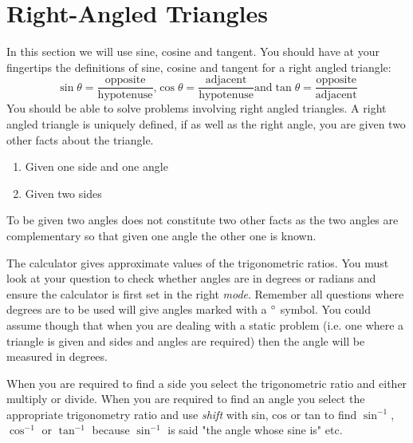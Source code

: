 \section{Right-Angled Triangles}
In this section we will use sine, cosine and tangent. You should have at your fingertips the definitions of sine, cosine and tangent for a right angled triangle:
\begin{equation*}\sin  \theta  =\frac{\text{opposite}}{\text{hypotenuse}}\text{,}\cos  \theta  =\frac{\text{adjacent}}{\text{hypotenuse}}\text{and}\tan  \theta  =\frac{\text{opposite}}{\text{adjacent}}
\end{equation*}
You should be able to solve problems involving right angled triangles. A right angled triangle is uniquely defined, if as well as the right angle, you are given two other facts about the triangle. 
\begin{enumerate}
\item Given one side and one angle 
\item Given two sides \end{enumerate}
To be given two angles does not constitute two other facts as the two angles are complementary so that given one angle the other one is known.

The calculator gives approximate values of the trigonometric ratios. You must look at your question to check whether angles are in degrees or radians and ensure the calculator is first set in the right \emph{mode}. Remember all questions where degrees are to be used will give angles marked with a $\mbox{{\ensuremath{{}^\circ}}}$ symbol. You could assume though that when you are dealing with a static problem (i.e. one where a triangle is given and sides and angles are required) then the angle will be measured in degrees. 

When you are required to find a side you select the trigonometric ratio and either multiply or divide. When you are required to find an angle you select the appropriate trigonometry ratio and use \emph{shift} with sin, cos or tan to find $\sin ^{ -1}$, $\cos ^{ -1}$ or $\tan ^{ -1}$ because $\sin ^{ -1}$ is said "the angle whose sine is" etc. 

